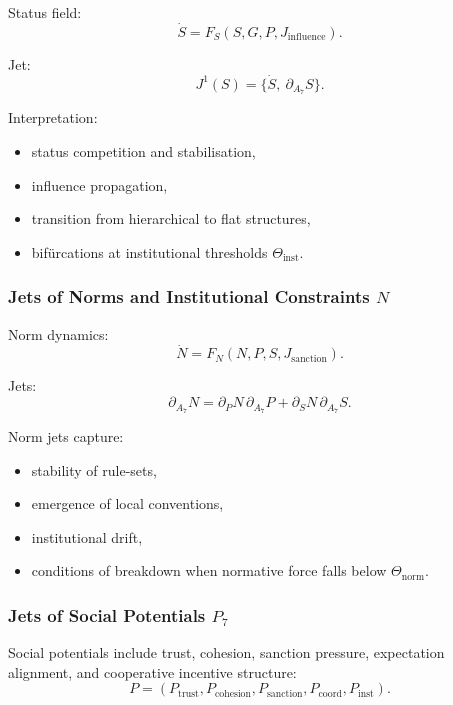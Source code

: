 Status field:
\[
\dot{S}=F_S(S,G,P,J_{\mathrm{influence}}).
\]

Jet:
\[
J^1(S)=\{\dot{S},\ \partial_{A_7}S\}.
\]

Interpretation:
\begin{itemize}
    \item status competition and stabilisation,
    \item influence propagation,
    \item transition from hierarchical to flat structures,
    \item bifürcations at institutional thresholds $\Theta_{\mathrm{inst}}$.
\end{itemize}


\subsubsection{Jets of Norms and Institutional Constraints \texorpdfstring{$N$}{N}}

Norm dynamics:
\[
\dot{N} = F_N(N,P,S,J_{\mathrm{sanction}}).
\]

Jets:
\[
\partial_{A_7}N 
= 
\partial_P N\, \partial_{A_7}P
+
\partial_S N\, \partial_{A_7}S.
\]

Norm jets capture:
\begin{itemize}
    \item stability of rule-sets,
    \item emergence of local conventions,
    \item institutional drift,
    \item conditions of breakdown when normative force falls below
          $\Theta_{\mathrm{norm}}$.
\end{itemize}


\subsubsection{Jets of Social Potentials \texorpdfstring{$P_7$}{P_7}}

Social potentials include trust, cohesion, sanction pressure, expectation
alignment, and cooperative incentive structure:
\[
P = (P_{\mathrm{trust}}, P_{\mathrm{cohesion}}, P_{\mathrm{sanction}},
P_{\mathrm{coord}}, P_{\mathrm{inst}}).
\]


